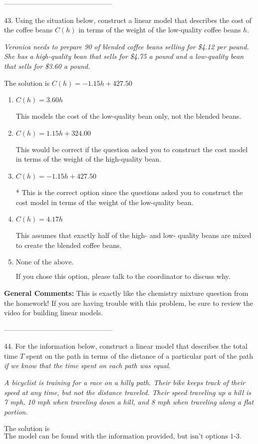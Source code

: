 \documentclass{article}[14pt]
\begin{document}
-----------------------------------------------

43. Using the situation below, construct a linear model that describes the cost of the coffee beans $C(h)$ in terms of the weight of the low-quality coffee beans $h$.
 \begin{center} \textit{Veronica needs to prepare 90 of blended coffee beans selling for \$4.12 per pound. She has a high-quality bean that sells for \$4.75 a pound and a low-quality bean that sells for \$3.60 a pound.} \end{center} 
The solution is $ C(h) = -1.15 h + 427.50 $ 

\begin{enumerate}[label=\Alph*.] 
\item $ C(h) = 3.60 h $ 

 This models the cost of the low-quality bean only, not the blended beans. 
\item $ C(h) = 1.15 h + 324.00 $ 

 This would be correct if the question asked you to construct the cost model in terms of the weight of the high-quality bean. 
\item $ C(h) = -1.15 h + 427.50 $ 

 * This is the correct option since the questions asked you to construct the cost model in terms of the weight of the low-quality bean. 
\item $ C(h) = 4.17 h $ 

 This assumes that exactly half of the high- and low- quality beans are mixed to create the blended coffee beans. 
\item $ \text{None of the above.} $ 

 If you chose this option, please talk to the coordinator to discuss why. 
\end{enumerate} 
 
\textbf{General Comments:} This is exactly like the chemistry mixture question from the homework! If you are having trouble with this problem, be sure to review the video for building linear models.

-----------------------------------------------

44. For the information below, construct a linear model that describes the total time $T$ spent on the path in terms of the distance of a particular part of the path \textit{if we know that the time spent on each path was equal}.
\begin{center} \textit{A bicyclist is training for a race on a hilly path. Their bike keeps track of their speed at any time, but not the distance traveled. Their speed traveling up a hill is 7 mph, 10 mph when traveling down a hill, and 8 mph when traveling along a flat portion.} \end{center} 
The solution is $ \text{The model can be found with the information provided, but isn't options 1-3.} $ 
\end{document}

